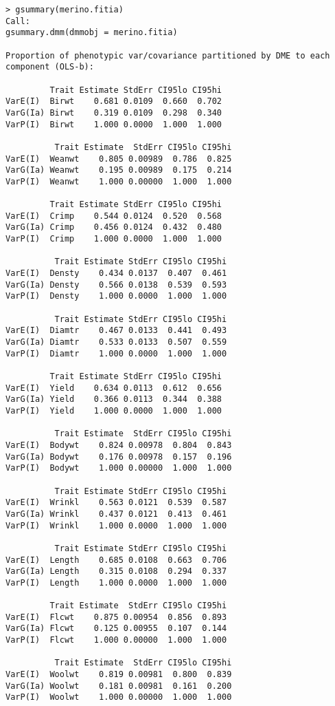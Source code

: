 \documentclass[titlepage]{article}  %
\begin{document}
\begin{verbatim}
> gsummary(merino.fitia)
Call:
gsummary.dmm(dmmobj = merino.fitia)

Proportion of phenotypic var/covariance partitioned by DME to each component (OLS-b):

         Trait Estimate StdErr CI95lo CI95hi
VarE(I)  Birwt    0.681 0.0109  0.660  0.702
VarG(Ia) Birwt    0.319 0.0109  0.298  0.340
VarP(I)  Birwt    1.000 0.0000  1.000  1.000

          Trait Estimate  StdErr CI95lo CI95hi
VarE(I)  Weanwt    0.805 0.00989  0.786  0.825
VarG(Ia) Weanwt    0.195 0.00989  0.175  0.214
VarP(I)  Weanwt    1.000 0.00000  1.000  1.000

         Trait Estimate StdErr CI95lo CI95hi
VarE(I)  Crimp    0.544 0.0124  0.520  0.568
VarG(Ia) Crimp    0.456 0.0124  0.432  0.480
VarP(I)  Crimp    1.000 0.0000  1.000  1.000

          Trait Estimate StdErr CI95lo CI95hi
VarE(I)  Densty    0.434 0.0137  0.407  0.461
VarG(Ia) Densty    0.566 0.0138  0.539  0.593
VarP(I)  Densty    1.000 0.0000  1.000  1.000

          Trait Estimate StdErr CI95lo CI95hi
VarE(I)  Diamtr    0.467 0.0133  0.441  0.493
VarG(Ia) Diamtr    0.533 0.0133  0.507  0.559
VarP(I)  Diamtr    1.000 0.0000  1.000  1.000

         Trait Estimate StdErr CI95lo CI95hi
VarE(I)  Yield    0.634 0.0113  0.612  0.656
VarG(Ia) Yield    0.366 0.0113  0.344  0.388
VarP(I)  Yield    1.000 0.0000  1.000  1.000

          Trait Estimate  StdErr CI95lo CI95hi
VarE(I)  Bodywt    0.824 0.00978  0.804  0.843
VarG(Ia) Bodywt    0.176 0.00978  0.157  0.196
VarP(I)  Bodywt    1.000 0.00000  1.000  1.000

          Trait Estimate StdErr CI95lo CI95hi
VarE(I)  Wrinkl    0.563 0.0121  0.539  0.587
VarG(Ia) Wrinkl    0.437 0.0121  0.413  0.461
VarP(I)  Wrinkl    1.000 0.0000  1.000  1.000

          Trait Estimate StdErr CI95lo CI95hi
VarE(I)  Length    0.685 0.0108  0.663  0.706
VarG(Ia) Length    0.315 0.0108  0.294  0.337
VarP(I)  Length    1.000 0.0000  1.000  1.000

         Trait Estimate  StdErr CI95lo CI95hi
VarE(I)  Flcwt    0.875 0.00954  0.856  0.893
VarG(Ia) Flcwt    0.125 0.00955  0.107  0.144
VarP(I)  Flcwt    1.000 0.00000  1.000  1.000

          Trait Estimate  StdErr CI95lo CI95hi
VarE(I)  Woolwt    0.819 0.00981  0.800  0.839
VarG(Ia) Woolwt    0.181 0.00981  0.161  0.200
VarP(I)  Woolwt    1.000 0.00000  1.000  1.000


\end{verbatim}
\end{document}
